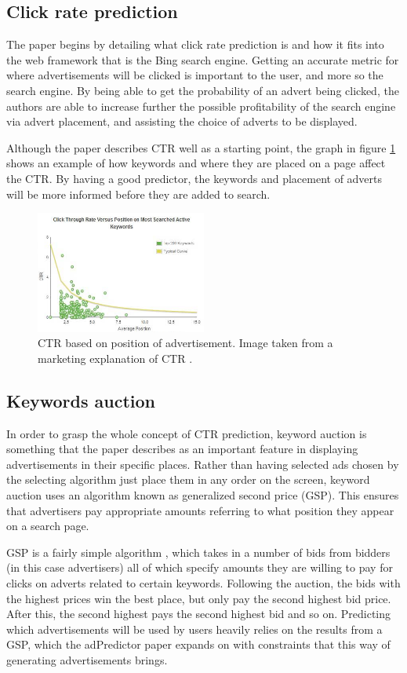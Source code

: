 \documentclass[journal]{IEEEtran}
\begin{document}
\subsection{Click rate prediction}
The paper begins by detailing what click rate prediction is and how it fits into the web framework that is the Bing search engine. Getting an accurate metric for where advertisements will be clicked is important to the user, and more so the search engine. By being able to get the probability of an advert being clicked, the authors are able to increase further the possible profitability of the search engine via advert placement, and assisting the choice of adverts to be displayed. \par
Although the paper describes CTR well as a starting point, the graph in figure \ref{fig:CTR} shows an example of how keywords and where they are placed on a page affect the CTR. By having a good predictor, the keywords and placement of adverts will be more informed before they are added to search.

\begin{figure}[!ht]
  \caption{CTR based on position of advertisement. Image taken from a marketing explanation of CTR \cite{ctr-image}.}
  \centering
  \label{fig:CTR}
    \includegraphics[width=0.5\textwidth]{CTR}
\end{figure}

\subsection{Keywords auction}
In order to grasp the whole concept of CTR prediction, keyword auction is something that the paper describes as an important feature in displaying advertisements in their specific places. Rather than having selected ads chosen by the selecting algorithm just place them in any order on the screen, keyword auction uses an algorithm known as generalized second price (GSP). This ensures that advertisers pay appropriate amounts referring to what position they appear on a search page. \par
GSP is a fairly simple algorithm \cite{keyword-auction}, which takes in a number of bids from bidders (in this case advertisers) all of which specify amounts they are willing to pay for clicks on adverts related to certain keywords. Following the auction, the bids with the highest prices win the best place, but only pay the second highest bid price. After this, the second highest pays the second highest bid and so on. Predicting which advertisements will be used by users heavily relies on the results from a GSP, which the adPredictor paper expands on with constraints that this way of generating advertisements brings.
\end{document}
